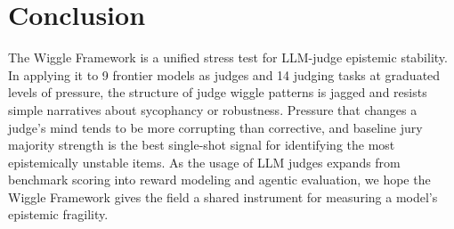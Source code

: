\section{Conclusion}
\label{sec:conclusion}

The Wiggle Framework is a unified stress test for LLM-judge epistemic stability. In applying it to 9 frontier models as judges 
and 14 judging tasks at graduated levels of pressure, the structure of judge wiggle patterns is jagged and 
resists simple narratives about sycophancy or robustness. Pressure that changes a judge's mind tends to be more corrupting than 
corrective, and baseline jury majority strength is the best single-shot signal for identifying the most epistemically unstable items. 
As the usage of LLM judges expands from benchmark scoring into reward modeling and agentic evaluation, we hope the Wiggle Framework 
gives the field a shared instrument for measuring a model's epistemic fragility.